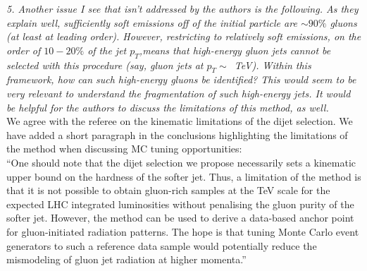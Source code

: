 \documentclass[a4paper,11pt]{article}
\begin{document}
\noindent\textit{5. Another issue I see that isn’t addressed by the
  authors is the following. As they explain well, sufficiently soft
  emissions off of the initial particle are $\sim 90\%$ gluons (at
  least at leading order). However, restricting to relatively soft
  emissions, on the order of $10-20\%$ of the jet $p_T$,means that
  high-energy gluon jets cannot be selected with this procedure (say,
  gluon jets at $p_T\sim$~TeV). Within this framework, how can such
  high-energy gluons be identified? This would seem to be very
  relevant to understand the fragmentation of such high-energy jets.
  It would be helpful for the authors to discuss the limitations of
  this method, as well.}
\\
We agree with the referee on the kinematic limitations of the dijet
selection. We have added a short paragraph in the conclusions
highlighting the limitations of the method when discussing MC tuning
opportunities:
\\

``One should note that the dijet selection we propose necessarily sets a kinematic upper bound on the hardness of the softer jet. Thus, a limitation of the method is that it is not possible to obtain gluon-rich
samples at the TeV scale for the expected LHC integrated luminosities without penalising
the gluon purity of the softer jet. However, the method can be used to derive a data-based
anchor point for gluon-initiated radiation patterns. The hope is that tuning Monte Carlo
event generators to such a reference data sample would potentially reduce the mismodeling
of gluon jet radiation at higher momenta.''
\end{document}
